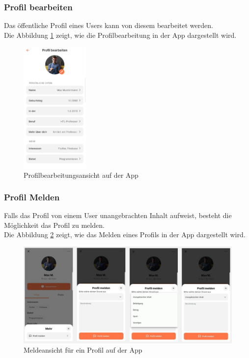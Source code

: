\subsubsection{Profil bearbeiten}

Das öffentliche Profil eines Users kann von diesem bearbeitet werden.
\\
Die Abbildung \ref{fig:edit-profile} zeigt, wie die Profilbearbeitung in der App dargestellt wird.

\begin{figure}[H]
  \centering
  \includegraphics[width=0.3\textwidth]{pics/edit-profile.jpg}
  \caption{Profilbearbeitungsansicht auf der App}
  \label{fig:edit-profile}
\end{figure}


\subsubsection{Profil Melden}
Falls das Profil von einem User unangebrachten Inhalt aufweist, besteht die Möglichkeit das Profil zu melden.
\\
Die Abbildung \ref{fig:report-profile} zeigt, wie das Melden eines Profils in der App dargestellt wird.

\begin{figure}[H]
  \centering
  \includegraphics[width=1\textwidth]{pics/report-profile.JPG}
  \caption{Meldeansicht für ein Profil auf der App}
  \label{fig:report-profile}
\end{figure}



